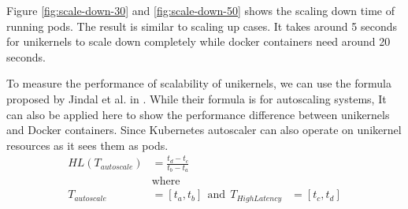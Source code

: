 Figure \ref{fig:scale-down-30} and \ref{fig:scale-down-50} shows the scaling down time of running pods. The result is similar to scaling up cases. It takes around 5 seconds for unikernels to scale down completely while docker containers need around 20 seconds. 

To measure the performance of scalability of unikernels, we can use the formula proposed by Jindal et al. in \cite{multilayered}. While their formula is for autoscaling systems, It can also be applied here to show the performance difference between unikernels and Docker containers. Since Kubernetes autoscaler can also operate on unikernel resources as it sees them as pods.
\begin{equation*}
  \begin{aligned}
  HL(T_{autoscale})&=\frac{t_d-t_c}{t_b-t_a} \\
  &\textrm{where} \\ 
  T_{autoscale}&=[t_a,t_b] \ \ \textrm{and} \ \ T_{HighLatency}&=[t_c,t_d]
  \end{aligned}
\end{equation*}

